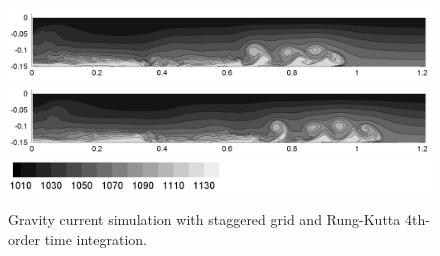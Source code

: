 \begin{figure}[htbp]
\begin{center}
\includegraphics[scale=0.55]{../figures/Staggered/Fig9case/060518c-RK4-dt-0009375-280-120/07.png}    \includegraphics[scale=0.55]{../figures/Staggered/Fig9case/060518c-RK4-dt-0009375-280-120/08.png}
\includegraphics[scale=0.55]{../figures/Staggered/Fig9case/label.png}
    \caption{Gravity current simulation with staggered grid and Rung-Kutta 4th-order time integration.}
    \label{fig:060518c-RK4-dt-0009375-280-120}
  \end{center}
\end{figure}

